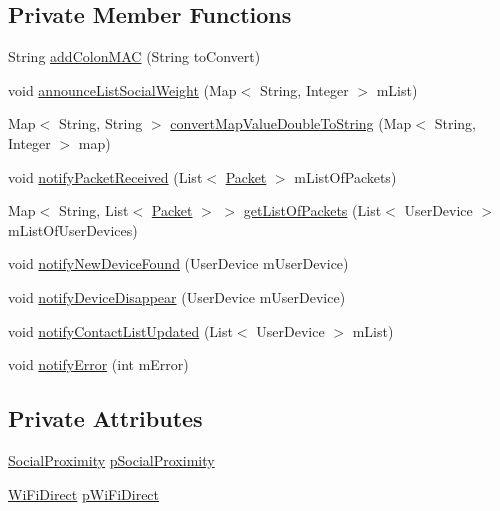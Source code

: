 \subsection*{Private Member Functions}
\begin{DoxyCompactItemize}
\item 
String \hyperlink{classcom_1_1copelabs_1_1oiframework_1_1router_1_1_routing_ae4f1793d12c6d079cf5b9881c3c37da8}{add\+Colon\+M\+A\+C} (String to\+Convert)
\item 
void \hyperlink{classcom_1_1copelabs_1_1oiframework_1_1router_1_1_routing_a858226e24ce2d6dd6c80579d59d4d32b}{announce\+List\+Social\+Weight} (Map$<$ String, Integer $>$ m\+List)
\item 
Map$<$ String, String $>$ \hyperlink{classcom_1_1copelabs_1_1oiframework_1_1router_1_1_routing_aea763e399345256b6992471ca927c4eb}{convert\+Map\+Value\+Double\+To\+String} (Map$<$ String, Integer $>$ map)
\item 
void \hyperlink{classcom_1_1copelabs_1_1oiframework_1_1router_1_1_routing_aa13558862a8cf3b097941b784cd81adc}{notify\+Packet\+Received} (List$<$ \hyperlink{classcom_1_1copelabs_1_1oiframework_1_1contentmanager_1_1_packet}{Packet} $>$ m\+List\+Of\+Packets)
\item 
Map$<$ String, List$<$ \hyperlink{classcom_1_1copelabs_1_1oiframework_1_1contentmanager_1_1_packet}{Packet} $>$ $>$ \hyperlink{classcom_1_1copelabs_1_1oiframework_1_1router_1_1_routing_a45f244e08d3e5e71c745c1517f14e419}{get\+List\+Of\+Packets} (List$<$ User\+Device $>$ m\+List\+Of\+User\+Devices)
\item 
void \hyperlink{classcom_1_1copelabs_1_1oiframework_1_1router_1_1_routing_acfb99144155277bff901572b3c574c38}{notify\+New\+Device\+Found} (User\+Device m\+User\+Device)
\item 
void \hyperlink{classcom_1_1copelabs_1_1oiframework_1_1router_1_1_routing_a537f880b57016bb88d8f806977c4b8af}{notify\+Device\+Disappear} (User\+Device m\+User\+Device)
\item 
void \hyperlink{classcom_1_1copelabs_1_1oiframework_1_1router_1_1_routing_a834835f4188adaa5f18fb428934d52b6}{notify\+Contact\+List\+Updated} (List$<$ User\+Device $>$ m\+List)
\item 
void \hyperlink{classcom_1_1copelabs_1_1oiframework_1_1router_1_1_routing_a2a7f53b5e97ec419cff6ff3022d60d70}{notify\+Error} (int m\+Error)
\end{DoxyCompactItemize}
\subsection*{Private Attributes}
\begin{DoxyCompactItemize}
\item 
\hyperlink{classcom_1_1copelabs_1_1oiframework_1_1socialproximity_1_1_social_proximity}{Social\+Proximity} \hyperlink{classcom_1_1copelabs_1_1oiframework_1_1router_1_1_routing_a2d75c4e7f78ea50811f94541832a64d1}{p\+Social\+Proximity}
\item 
\hyperlink{classcom_1_1copelabs_1_1oiframework_1_1wifi_1_1_wi_fi_direct}{Wi\+Fi\+Direct} \hyperlink{classcom_1_1copelabs_1_1oiframework_1_1router_1_1_routing_aa0ebfed6845783ed64cd90cce80d56e0}{p\+Wi\+Fi\+Direct}
\end{DoxyCompactItemize}


